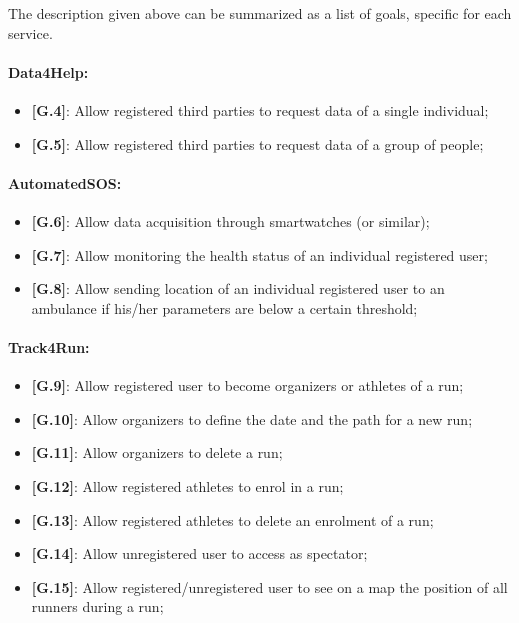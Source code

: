 The description given above can be summarized as a list of goals, specific for each service.
\paragraph{Data4Help:}
\begin{itemize}
  \item \textbf{[G.4]}: Allow registered third parties to request data of a single individual;
  \item \textbf{[G.5]}: Allow registered third parties to request data of a group of people;
\end{itemize}

\paragraph{AutomatedSOS:}
\begin{itemize}
  \item \textbf{[G.6]}: Allow data acquisition through smartwatches (or similar);
  \item \textbf{[G.7]}: Allow monitoring the health status of an individual registered user;
  \item \textbf{[G.8]}: Allow sending location of an individual registered user to an ambulance if his/her parameters are below a certain threshold;
\end{itemize}

\paragraph{Track4Run:}
\begin{itemize}
  \item \textbf{[G.9]}: Allow registered user to become organizers or athletes of a run;
  \item \textbf{[G.10]}: Allow organizers to define the date and the path for a new run;
  \item \textbf{[G.11]}: Allow organizers to delete a run;
  \item \textbf{[G.12]}: Allow registered athletes to enrol in a run;
  \item \textbf{[G.13]}: Allow registered athletes to delete an enrolment of a run;
  \item \textbf{[G.14]}: Allow unregistered user to access as spectator;
  \item \textbf{[G.15]}: Allow registered/unregistered user to see on a map the position of all runners during a run;
\end{itemize}

